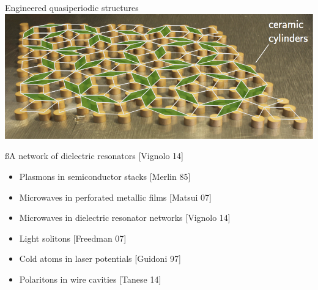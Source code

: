 \begin{frame}{Engineered quasiperiodic structures}
\centering
\includegraphics[width=.5\textwidth]{img/1_intro/dielectric_resonators.png}

{\ss{A network of dielectric resonators [Vignolo \etal{} 14]}}

\begin{itemize}
	\item Plasmons in semiconductor stacks [Merlin \etal{} 85]
	\item Microwaves in perforated metallic films [Matsui \etal{} 07]
	\item Microwaves in dielectric resonator networks [Vignolo \etal{} 14]
	\item Light solitons [Freedman \etal{} 07]
	\item Cold atoms in laser potentials [Guidoni \etal{} 97]
	\item Polaritons in wire cavities [Tanese \etal{} 14]
\end{itemize}
\end{frame}


